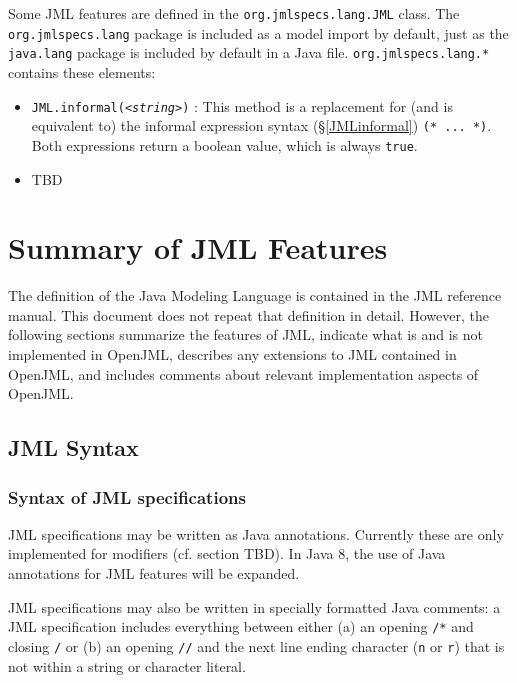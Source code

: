 Some JML features are defined in the \texttt{org.jmlspecs.lang.JML} class. The \texttt{org.jmlspecs.lang} package is included as a model import by default, just as the \texttt{java.lang} package is included by default in a Java file. \texttt{org.jmlspecs.lang.*}
contains these elements:
\begin{itemize}
\item \texttt{JML.informal(\textit{<string>}\texttt{)}} : This method is a replacement for (and is equivalent to) the informal expression syntax (\S\ref{JMLinformal}) \texttt{(* ... *)}. Both expressions return a boolean value, which is always \texttt{true}.

\item TBD

\end{itemize}

\chapter{Summary of JML Features}

The definition of the Java Modeling Language is contained in the JML reference manual.\cite{TBD}
This document does not repeat that definition in detail. However, the following sections summarize the features of JML, indicate what is and is not implemented in OpenJML, describes any extensions to JML contained in OpenJML, and includes
comments about relevant implementation aspects of OpenJML.

\section{JML Syntax}

\subsection{Syntax of JML specifications}

JML specifications may be written as Java annotations. Currently these are only implemented for modifiers (cf. section TBD). In Java 8, the use of Java annotations for JML features will be expanded.

JML specifications may also be written in specially formatted Java comments:
a JML specification includes everything between either (a) an opening {\tt /*\at} and closing {\tt */}
or (b) an opening {\tt //\at} and the next line ending character ({\tt \bs n}
or {\tt \bs r}) that is not within a string or character literal.

